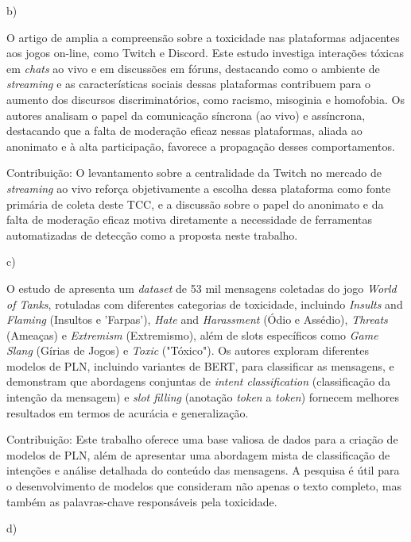 \documentclass{eic-bcc-tcc}
\begin{document}
b) \cite{sbgames}

O artigo de \cite{sbgames} amplia a compreensão sobre a toxicidade nas plataformas adjacentes aos jogos on-line, como Twitch e Discord. Este estudo investiga interações tóxicas em \textit{chats} ao vivo e em discussões em fóruns, destacando como o ambiente de \textit{streaming} e as características sociais dessas plataformas contribuem para o aumento dos discursos discriminatórios, como racismo, misoginia e homofobia. Os autores analisam o papel da comunicação síncrona (ao vivo) e assíncrona, destacando que a falta de moderação eficaz nessas plataformas, aliada ao anonimato e à alta participação, favorece a propagação desses comportamentos.

Contribuição: O levantamento sobre a centralidade da Twitch no mercado de \textit{streaming} ao vivo reforça objetivamente a escolha dessa plataforma como fonte primária de coleta deste TCC, e a discussão sobre o papel do anonimato e da falta de moderação eficaz motiva diretamente a necessidade de ferramentas automatizadas de detecção como a proposta neste trabalho.


c) \cite{naseem-etal-2025-gametox}

O estudo de \cite{naseem-etal-2025-gametox} apresenta um \textit{dataset} de 53 mil mensagens coletadas do jogo \textit{World of Tanks}, rotuladas com diferentes categorias de toxicidade, incluindo \textit{Insults} and \textit{Flaming} (Insultos e 'Farpas'), \textit{Hate} and \textit{Harassment} (Ódio e Assédio), \textit{Threats} (Ameaças) e \textit{Extremism} (Extremismo), além de slots específicos como \textit{Game Slang} (Gírias de Jogos) e \textit{Toxic} ("Tóxico"). Os autores exploram diferentes modelos de PLN, incluindo variantes de BERT, para classificar as mensagens, e demonstram que abordagens conjuntas de \textit{intent classification} (classificação da intenção da mensagem) e \textit{slot filling} (anotação \textit{token} a \textit{token}) fornecem melhores resultados em termos de acurácia e generalização.

Contribuição: Este trabalho oferece uma base valiosa de dados para a criação de modelos de PLN, além de apresentar uma abordagem mista de classificação de intenções e análise detalhada do conteúdo das mensagens. A pesquisa é útil para o desenvolvimento de modelos que consideram não apenas o texto completo, mas também as palavras-chave responsáveis pela toxicidade.


d) \cite{doi:10.1177/13548565211028809}
\end{document}
